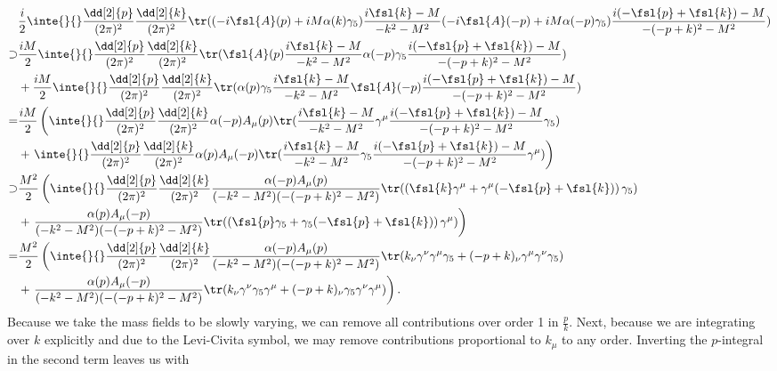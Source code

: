 \begin{align*}
	       &\frac{i}{2}\inte{}{}\frac{\dd[2]{p}}{(2\pi)^{2}}\frac{\dd[2]{k}}{(2\pi)^{2}}\tr((-i\fsl{A}(p) + iM\alpha(k)\gamma_{5})\frac{i\fsl{k} - M}{-k^{2} - M^{2}}(-i\fsl{A}(-p) + iM\alpha(-p)\gamma_{5})\frac{i(-\fsl{p} + \fsl{k}) - M}{-(-p + k)^{2} - M^{2}}) \\
	\supset& \frac{iM}{2}\inte{}{}\frac{\dd[2]{p}}{(2\pi)^{2}}\frac{\dd[2]{k}}{(2\pi)^{2}}\tr(\fsl{A}(p)\frac{i\fsl{k} - M}{-k^{2} - M^{2}}\alpha(-p)\gamma_{5}\frac{i(-\fsl{p} + \fsl{k}) - M}{-(-p + k)^{2} - M^{2}}) \\
	       &+ \frac{iM}{2}\inte{}{}\frac{\dd[2]{p}}{(2\pi)^{2}}\frac{\dd[2]{k}}{(2\pi)^{2}}\tr(\alpha(p)\gamma_{5}\frac{i\fsl{k} - M}{-k^{2} - M^{2}}\fsl{A}(-p)\frac{i(-\fsl{p} + \fsl{k}) - M}{-(-p + k)^{2} - M^{2}}) \\
	      =& \frac{iM}{2}\left(\inte{}{}\frac{\dd[2]{p}}{(2\pi)^{2}}\frac{\dd[2]{k}}{(2\pi)^{2}}\alpha(-p)A_{\mu}(p)\tr(\frac{i\fsl{k} - M}{-k^{2} - M^{2}}\gamma^{\mu}\frac{i(-\fsl{p} + \fsl{k}) - M}{-(-p + k)^{2} - M^{2}}\gamma_{5}) \right. \\
	       &+ \left. \inte{}{}\frac{\dd[2]{p}}{(2\pi)^{2}}\frac{\dd[2]{k}}{(2\pi)^{2}}\alpha(p)A_{\mu}(-p)\tr(\frac{i\fsl{k} - M}{-k^{2} - M^{2}}\gamma_{5}\frac{i(-\fsl{p} + \fsl{k}) - M}{-(-p + k)^{2} - M^{2}}\gamma^{\mu})\right) \\
	\supset& \frac{M^{2}}{2}\left(\inte{}{}\frac{\dd[2]{p}}{(2\pi)^{2}}\frac{\dd[2]{k}}{(2\pi)^{2}}\frac{\alpha(-p)A_{\mu}(p)}{(-k^{2} - M^{2})(-(-p + k)^{2} - M^{2})}\tr(\left(\fsl{k}\gamma^{\mu} + \gamma^{\mu}(-\fsl{p} + \fsl{k})\right)\gamma_{5}) \right. \\
	       &+ \left. \frac{\alpha(p)A_{\mu}(-p)}{(-k^{2} - M^{2})(-(-p + k)^{2} - M^{2})}\tr(\left(\fsl{p}\gamma_{5} + \gamma_{5}(-\fsl{p} + \fsl{k})\right)\gamma^{\mu})\right) \\
	      =& \frac{M^{2}}{2}\left(\inte{}{}\frac{\dd[2]{p}}{(2\pi)^{2}}\frac{\dd[2]{k}}{(2\pi)^{2}}\frac{\alpha(-p)A_{\mu}(p)}{(-k^{2} - M^{2})(-(-p + k)^{2} - M^{2})}\tr(k_{\nu}\gamma^{\nu}\gamma^{\mu}\gamma_{5} + (-p + k)_{\nu}\gamma^{\mu}\gamma^{\nu}\gamma_{5}) \right. \\
	       &+ \left. \frac{\alpha(p)A_{\mu}(-p)}{(-k^{2} - M^{2})(-(-p + k)^{2} - M^{2})}\tr(k_{\nu}\gamma^{\nu}\gamma_{5}\gamma^{\mu} + (-p + k)_{\nu}\gamma_{5}\gamma^{\nu}\gamma^{\mu})\right).
\end{align*}
Because we take the mass fields to be slowly varying, we can remove all contributions over order 1 in $\frac{p}{k}$. Next, because we are integrating over $k$ explicitly and due to the Levi-Civita symbol, we may remove contributions proportional to $k_{\mu}$ to any order. Inverting the $p$-integral in the second term leaves us with
